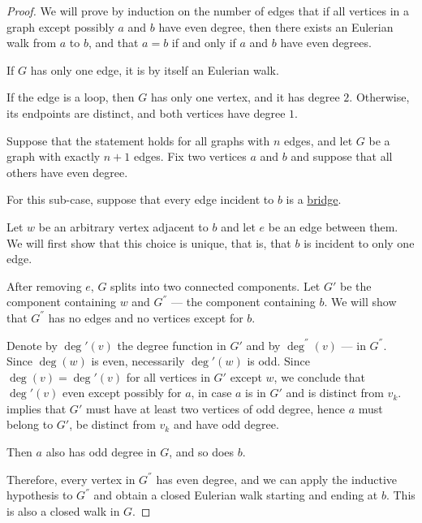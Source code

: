 \begin{proof}
  \NecessitySubProof We will prove by induction on the number of edges that if all vertices in a graph except possibly \( a \) and \( b \) have even degree, then there exists an Eulerian walk from \( a \) to \( b \), and that \( a = b \) if and only if \( a \) and \( b \) have even degrees.

   If \( G \) has only one edge, it is by itself an Eulerian walk.

  If the edge is a loop, then \( G \) has only one vertex, and it has degree \( 2 \). Otherwise, its endpoints are distinct, and both vertices have degree \( 1 \).

   Suppose that the statement holds for all graphs with \( n \) edges, and let \( G \) be a graph with exactly \( n + 1 \) edges. Fix two vertices \( a \) and \( b \) and suppose that all others have even degree.

  For this sub-case, suppose that every edge incident to \( b \) is a \hyperref[def:graph_bridge]{bridge}.

  Let \( w \) be an arbitrary vertex adjacent to \( b \) and let \( e \) be an edge between them. We will first show that this choice is unique, that is, that \( b \) is incident to only one edge.

  After removing \( e \), \( G \) splits into two connected components. Let \( G' \) be the component containing \( w \) and \( G^\dprime \) --- the component containing \( b \). We will show that \( G^\dprime \) has no edges and no vertices except for \( b \).

  Denote by \( \deg'(v) \) the degree function in \( G' \) and by \( \deg^\dprime(v) \) --- in \( G^\dprime \). Since \( \deg(w) \) is even, necessarily \( \deg'(w) \) is odd. Since \( \deg(v) = \deg'(v) \) for all vertices in \( G' \) except \( w \), we conclude that \( \deg'(v) \) even except possibly for \( a \), in case \( a \) is in \( G' \) and is distinct from \( v_k \).  implies that \( G' \) must have at least two vertices of odd degree, hence \( a \) must belong to \( G' \), be distinct from \( v_k \) and have odd degree.

  Then \( a \) also has odd degree in \( G \), and so does \( b \).

  Therefore, every vertex in \( G^\dprime \) has even degree, and we can apply the inductive hypothesis to \( G^\dprime \) and obtain a closed Eulerian walk starting and ending at \( b \). This is also a closed walk in \( G \).


\end{proof}
